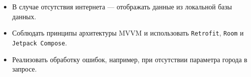 \begin{itemize}
  \item В случае отсутствия интернета — отображать данные из локальной базы данных.
  \item Соблюдать принципы архитектуры MVVM и использовать \texttt{Retrofit}, \texttt{Room} и \texttt{Jetpack Compose}.
  \item Реализовать обработку ошибок, например, при отсутствии параметра города в запросе.
\end{itemize}
